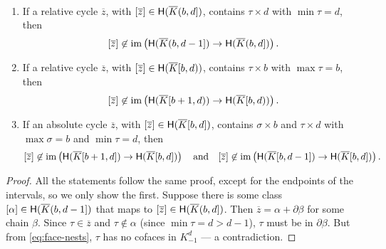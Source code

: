 \documentclass[cleveref,a4paper,english,nolineno]{socg-lipics-v2021}
\newcommand{\im}{\operatorname{im}}
\newcommand{\Hgr}{{\sf H}}
\newcommand{\prism}[1]{\overline{#1}}
\newcommand{\bdry}{\partial}
\newcommand{\pK}{\prism{K}}
\newcommand{\pz}{\prism{z}}
\newcommand{\subK}[1]{K_{-1}^{#1}}
\newcommand{\ssx}{\sigma}
\newcommand{\tsx}{\tau}
\begin{document}
\begin{lemma}~
    \label{clm:closed-endpoint}
    \begin{enumerate}
            \item
            If a relative cycle $\pz$, with $[\pz] \in \Hgr(\pK(b,d])$, contains $\tsx \times d$ with $\min \tsx = d$, then
            \[
                [\pz] \not\in \im \left( \Hgr(\pK(b,d-1]) \to \Hgr(\pK(b,d]) \right).
            \]
        \item
            If a relative cycle $\pz$, with $[\pz] \in \Hgr(\pK[b,d))$, contains $\tsx \times b$ with $\max \tsx = b$, then
            \[
                [\pz] \not\in \im \left( \Hgr(\pK[b+1,d)) \to \Hgr(\pK[b,d)) \right).
            \]
        \item
            If an absolute cycle $\pz$, with $[\pz] \in \Hgr(\pK[b,d])$, contains $\ssx \times b$
            and $\tsx \times d$ with $\max \ssx = b$ and $\min \tsx = d$, then
            \[
                [\pz] \not\in \im \left( \Hgr(\pK[b+1,d]) \to \Hgr(\pK[b,d]) \right)
                \quad \text{and} \quad
                [\pz] \not\in \im \left( \Hgr(\pK[b,d-1]) \to \Hgr(\pK[b,d]) \right).
            \]
    \end{enumerate}
\end{lemma}
\begin{proof}
    All the statements follow the same proof, except for the endpoints of the
    intervals, so we only show the first.
    Suppose there is some class $[\alpha] \in \Hgr(\pK(b,d-1])$ that
    maps to $[\pz] \in \Hgr(\pK(b,d])$.
    Then $\pz = \alpha + \bdry \beta$ for some chain $\beta$.
    Since $\tsx \in \pz$ and $\tsx \not\in \alpha$ (since $\min \tsx = d > d-1$),
    $\tsx$ must be in $\bdry \beta$. But from \cref{eq:face-nests}, $\tsx$ has no cofaces
    in $\subK{d}$ --- a contradiction.
\end{proof}
\end{document}
